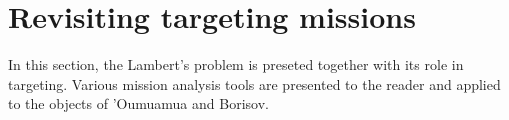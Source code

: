 \chapter{Revisiting targeting missions}

In this section, the Lambert's problem is preseted together with its role in
targeting. Various mission analysis tools are presented to the reader and
applied to the objects of 'Oumuamua and Borisov.





